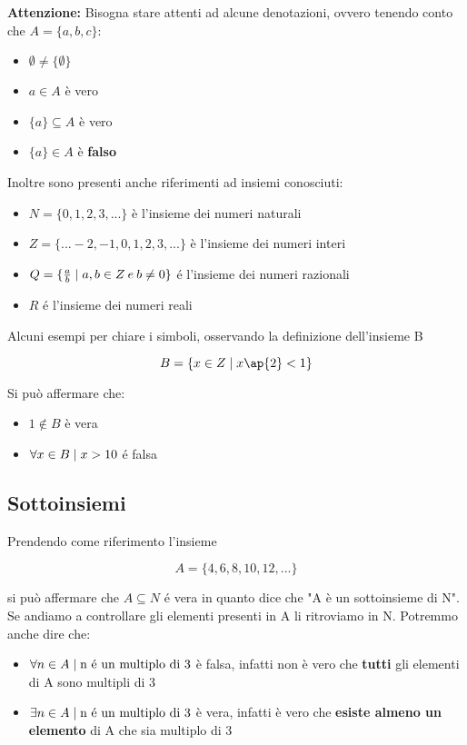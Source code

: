 \documentclass[12pt,a4paper]{article}
\newcommand{\Setsuchthat}{\;\ifnum\currentgrouptype=16 \middle\fi|\;} %
\begin{document}
  \textbf{Attenzione:} Bisogna stare attenti ad alcune denotazioni, ovvero tenendo conto che $ A = \{a, b, c\} $:

  \begin{itemize}
    \item $ \emptyset \neq \{\emptyset\} $
    \item $ a \in A $ è vero
    \item $ \{a\} \subseteq A $ è vero
    \item $ \{a\} \in A $ è \textbf{falso}
  \end{itemize}

  Inoltre sono presenti anche riferimenti ad insiemi conosciuti:

  \begin{itemize}
    \item $ N = \{0, 1, 2, 3, ...\} $ è l'insieme dei numeri naturali
    \item $ Z = \{ ... -2, -1, 0, 1, 2, 3, ...\} $ è l'insieme dei numeri interi
    \item $ Q  = \{\frac{a}{b} \Setsuchthat a,b \in Z\:e\:b \neq 0\} $ é l'insieme dei numeri razionali
    \item $ R $ é l'insieme dei numeri reali
  \end{itemize}
  
  Alcuni esempi per chiare i simboli, osservando la definizione dell'insieme B

  \begin{equation}
    B = \{x \in Z \Setsuchthat x\ap{2} < 1\}
  \end{equation}

  Si può affermare che:
  \begin{itemize}
    \item $ 1 \notin B $ è vera
    \item $ \forall x \in B \Setsuchthat x > 10 $ é falsa 
  \end{itemize}

  \subsection{Sottoinsiemi}
  Prendendo come riferimento l'insieme

  \begin{equation}
    A = \{4, 6, 8, 10, 12, ...\}
  \end{equation}

  si può affermare che $ A \subseteq N $ é vera in quanto dice che "A è un sottoinsieme di N". Se andiamo a controllare gli elementi presenti in A li ritroviamo in N. Potremmo anche dire che:

  \begin{itemize}
    \item $ \forall n \in A \Setsuchthat \text{n é un multiplo di 3} $ è falsa, infatti non è vero che \textbf{tutti} gli elementi di A sono multipli di 3

    \item $ \exists n \in A \Setsuchthat \text{n é un multiplo di 3} $ è vera, infatti è vero che \textbf{esiste almeno un elemento} di A che sia multiplo di 3
  \end{itemize}
  
\end{document}
